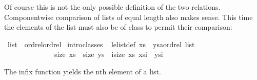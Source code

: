%
\begin{isabellebody}%
\def\isabellecontext{Overloading{\isadigit{2}}}%
%
\begin{isamarkuptext}%
Of course this is not the only possible definition of the two relations.
Componentwise comparison of lists of equal length also makes sense. This time
the elements of the list must also be of class  to permit their
comparison:%
\end{isamarkuptext}%
\ list\ {\isacharcolon}{\isacharcolon}\ {\isacharparenleft}ordrel{\isacharparenright}ordrel\isanewline
{}\ intro{\isacharunderscore}classes\isanewline
\isanewline
{}\ {\isacharparenleft}\isanewline
le{\isacharunderscore}list{\isacharunderscore}def{\isacharcolon}\ {\isachardoublequote}xs\ {\isacharless}{\isacharless}{\isacharequal}\ {\isacharparenleft}ys{\isacharcolon}{\isacharcolon}{\isacharprime}a{\isacharcolon}{\isacharcolon}ordrel\ list{\isacharparenright}\ {\isasymequiv}\isanewline
\ \ \ \ \ \ \ \ \ \ \ \ \ \ size\ xs\ {\isacharequal}\ size\ ys\ {\isasymand}\ {\isacharparenleft}{\isasymforall}i{\isacharless}size\ xs{\isachardot}\ xs{\isacharbang}i\ {\isacharless}{\isacharless}{\isacharequal}\ ys{\isacharbang}i{\isacharparenright}{\isachardoublequote}%
\begin{isamarkuptext}%
\noindent
The infix function \isa{{\isacharbang}} yields the nth element of a list.
\end{isamarkuptext}%
\end{isabellebody}%
